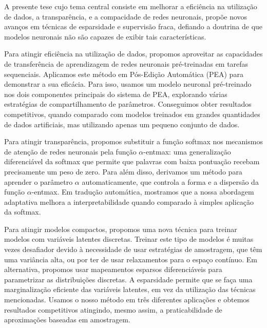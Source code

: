 \onehalfspacing
\begin{resumo}

    A presente tese cujo tema central consiste em melhorar a
    eficiência na utilização de dados, a transparência, e a
    compacidade de redes neuronais, propõe novos avanços em técnicas de
    esparsidade e supervisão fraca, defiando a doutrina de que
    modelos neuronais não são capazes de exibir tais características.

    Para atingir eficiência na utilização de dados, propomos
    aproveitar as capacidades de transferência de aprendizagem de
    redes neuronais pré-treinadas em tarefas sequenciais. Aplicamos
    este método em Pós-Edição Automática (PEA) para demonstrar a sua
    eficácia. Para isso, usamos um modelo neuronal pré-treinado nos
    dois componentes principais do sistema de PEA, explorando várias
    estratégias de compartilhamento de parâmetros. Conseguimos obter
    resultados competitivos, quando comparado com modelos treinados
    em grandes quantidades de dados artificiais, mas utilizando
    apenas um pequeno conjunto de dados.

    Para atingir transparência, propomos substituir a função softmax
    nos mecanismos de atenção de redes neuronais pela função
    $\alpha$-entmax: uma generalização diferenciável da softmax que
    permite que palavras com baixa pontuação recebam precisamente um
    peso de zero. Para além disso, derivamos um método para aprender
    o parâmetro $\alpha$ automaticamente, que controla a forma e a
    dispersão da função $\alpha$-entmax. Em tradução automática,
    mostramos que a nossa abordagem adaptativa melhora a
    interpretabilidade quando comparado à simples aplicação da
    softmax.

    Para atingir modelos compactos, propomos uma nova técnica para
    treinar modelos com variáveis latentes discretas. Treinar este
    tipo de modelos é muitas vezes desafiador devido à necessidade de
    usar estratégias de amostragem, que têm uma variância alta, ou
    por ter de usar relaxamentos para o espaço contínuo. Em
    alternativa, propomos usar mapeamentos esparsos diferenciáveis
    para parametrizar as distribuições discretas. A esparsidade
    permite que se faça uma marginalização eficiente das variáveis
    latentes, em vez da utilização das técnicas mencionadas. Usamos o
    nosso método em três diferentes aplicações e obtemos resultados
    competitivos atingindo, mesmo assim, a praticabilidade de
    aproximações baseadas em amostragem.

\end{resumo}
